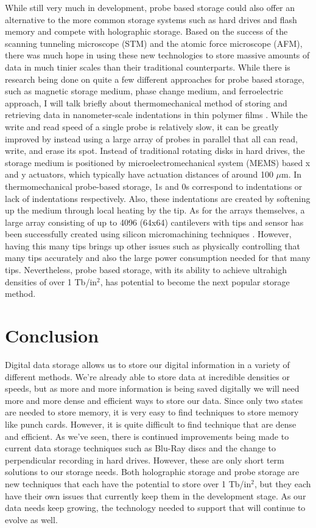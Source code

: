 \documentclass[ notitlepage, numerical, 11pt]{revtex4-1} %
\begin{document}
While still very much in development, probe based storage could also offer an alternative to the more common storage systems such as hard drives and flash memory and compete with holographic storage. Based on the success of the scanning tunneling microscope (STM) and the atomic force microscope (AFM), there was much hope in using these new technologies to store massive amounts of data in much tinier scales than their traditional counterparts. While there is research being done on quite a few different approaches for probe based storage, such as magnetic storage medium, phase change medium, and ferroelectric approach, I will talk briefly about thermomechanical method of storing and retrieving data in nanometer-scale indentations in thin polymer films \cite{probe}.  While the write and read speed of a single probe is relatively slow, it can be greatly improved by instead using a large array of probes in parallel that all can read, write, and erase its spot. Instead of traditional rotating disks in hard drives, the storage medium is positioned by microelectromechanical system (MEMS) based x and y actuators, which typically have actuation distances of around 100 $\mu$m. In thermomechanical probe-based storage, 1s and 0s correspond to indentations or lack of indentations respectively. Also, these indentations are created by softening up the medium through local heating by the tip. As for the arrays themselves, a large array consisting of up to 4096 (64x64) cantilevers with tips and sensor has been successfully created using silicon micromachining techniques \cite{probe}.  However, having this many tips brings up other issues such as physically controlling that many tips accurately and also the large power consumption needed for that many tips. Nevertheless, probe based storage, with its ability to achieve ultrahigh densities of over 1 Tb/in$^2$, has potential to become the next popular storage method.


\section{Conclusion}
Digital data storage allows us to store our digital information in a variety of different methods. We're already able to store data at incredible densities or speeds, but as more and more information is being saved digitally we will need more and more dense and efficient ways to store our data. Since only two states are needed to store memory, it is very easy to find techniques to store memory like punch cards. However, it is quite difficult to find technique that are dense and efficient. As we've seen, there is continued improvements being made to current data storage techniques such as Blu-Ray discs and the change to perpendicular recording in hard drives. However, these are only short term solutions to our storage needs. Both holographic storage and probe storage are new techniques that each have the potential to store over 1 Tb/in$^2$, but they each have their own issues that currently keep them in the development stage. As our data needs keep growing, the technology needed to support that will continue to evolve as well.





\end{document}
